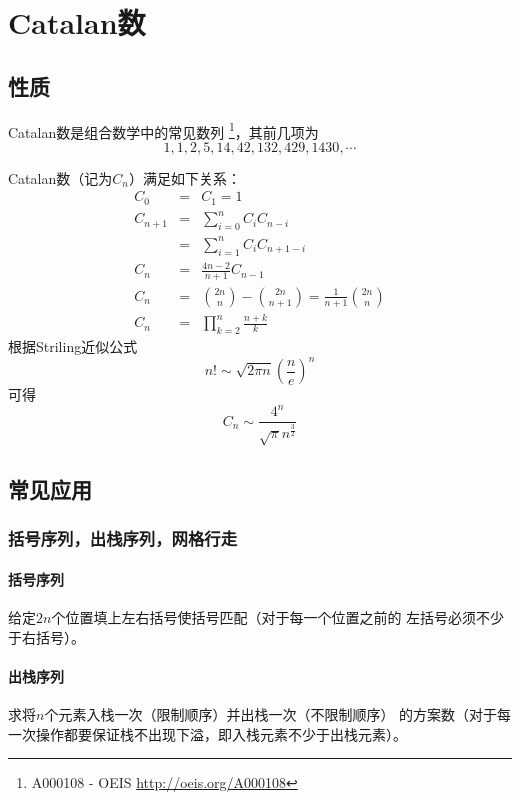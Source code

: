 \section{Catalan数}
\subsection{性质}
Catalan数是组合数学中的常见数列
\footnote{A000108 - OEIS \url{http://oeis.org/A000108}}，其前几项为
\begin{displaymath}
	1, 1, 2, 5, 14, 42, 132, 429, 1430, \cdots
\end{displaymath}

Catalan数（记为$C_n$）满足如下关系：
\begin{eqnarray}
	C_0&=&C_1=1\\
	C_{n+1}&=&\sum_{i=0}^n{C_iC_{n-i}}\label{CT2}\\
	&=&\sum_{i=1}^n{C_iC_{n+1-i}}\label{CT3}\\
	C_n&=&\frac{4n-2}{n+1}C_{n-1}\\
	C_n&=&{2n \choose n}-{2n \choose n+1}=\frac{1}{n+1}{2n \choose n}\\
	C_n&=&\prod_{k=2}^n\frac{n+k}{k}
\end{eqnarray}
根据Striling近似公式
\begin{displaymath}
	n!\sim\sqrt{2\pi n}\left(\frac{n}{e}\right)^n
\end{displaymath}
可得
\begin{displaymath}
	C_n\sim\frac{4^n}{\sqrt{\pi} n^\frac{3}{2}}
\end{displaymath}
\subsection{常见应用}
\subsubsection{括号序列，出栈序列，网格行走}
\paragraph{括号序列} 给定$2n$个位置填上左右括号使括号匹配（对于每一个位置之前的
左括号必须不少于右括号）。
\paragraph{出栈序列} 求将$n$个元素入栈一次（限制顺序）并出栈一次（不限制顺序）
的方案数（对于每一次操作都要保证栈不出现下溢，即入栈元素不少于出栈元素）。

